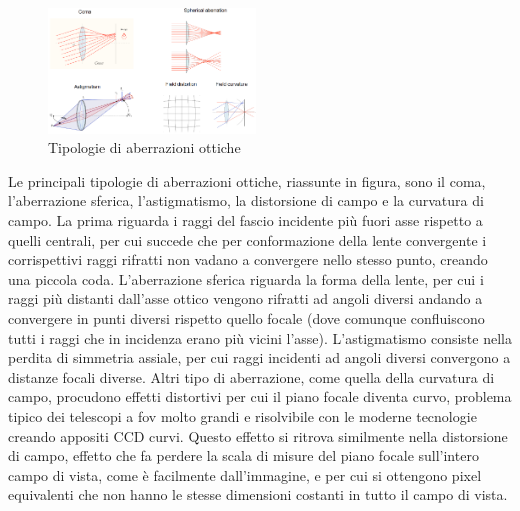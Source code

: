 \documentclass[a4paper,twoside,openany,notitlepage]{book}
\theoremstyle{definition}
\theoremstyle{plain}
\begin{document}
\begin{figure}
	\vspace{-10pt}
	\centering
	\includegraphics[width=0.49\textwidth]{Immagini/Capitolo2/Aberrazioni.png}
	\caption*{Tipologie di aberrazioni ottiche}
	\vspace{-10pt}
\end{figure}

Le principali tipologie di aberrazioni ottiche, riassunte in figura, sono il coma, l'aberrazione sferica, l'astigmatismo, la distorsione di campo e la curvatura di campo. La prima riguarda i raggi del fascio incidente più fuori asse rispetto a quelli centrali, per cui succede che per conformazione della lente convergente i corrispettivi raggi rifratti non vadano a convergere nello stesso punto, creando una piccola coda. L'aberrazione sferica riguarda la forma della lente, per cui i raggi più distanti dall'asse ottico vengono rifratti ad angoli diversi andando a convergere in punti diversi rispetto quello focale (dove comunque confluiscono tutti i raggi che in incidenza erano più vicini l'asse). L'astigmatismo consiste nella perdita di simmetria assiale, per cui raggi incidenti ad angoli diversi convergono a distanze focali diverse. Altri tipo di aberrazione, come quella della curvatura di campo, procudono effetti distortivi per cui il piano focale diventa curvo, problema tipico dei telescopi a fov molto grandi e risolvibile con le moderne tecnologie creando appositi CCD curvi. Questo effetto si ritrova similmente nella distorsione di campo, effetto che fa perdere la scala di misure del piano focale sull'intero campo di vista, come è facilmente dall'immagine, e per cui si ottengono pixel equivalenti che non hanno le stesse dimensioni costanti in tutto il campo di vista.

\end{document}
